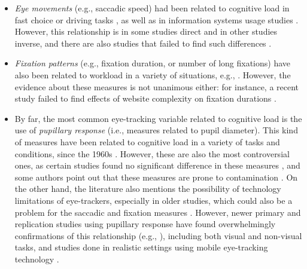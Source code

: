 \documentclass[10pt,journal,compsoc]{IEEEtran}
\begin{document}
\begin{itemize}
\item \textit{Eye movements} (e.g., saccadic speed) had been related to cognitive load in fast choice \cite{boucsein2000engineering} or driving tasks \cite{reyes2008effects}, as well as in information systems usage studies \cite{Buettner2013}. However, this relationship is in some studies direct and in other studies inverse, and there are also studies that failed to find such differences \cite{de2009eye}.
\item \textit{Fixation patterns} (e.g., fixation duration, or number of long fixations) have also been related to workload in a variety of situations, e.g., \cite{backs1992eye,goldberg2002eye,poole2006eye,Buettner2013}. However, the evidence about these measures is not unanimous either: for instance, a recent study failed to find effects of website complexity on fixation durations \cite{wang2014eye}.
\item By far, the most common eye-tracking variable related to cognitive load is the use of \textit{pupillary response} (i.e., measures related to pupil diameter). This kind of measures have been related to cognitive load in a variety of tasks and conditions, since the 1960s \cite{kahneman1967perceptual}. However, these are also the most controversial ones, as certain studies found no significant difference in these measures \cite{schultheis2004assessing}, and some authors point out that these measures are prone to contamination \cite{poole2006eye}. On the other hand, the literature also mentions the possibility of technology limitations of eye-trackers, especially in older studies, which could also be a problem for the saccadic and fixation measures \cite{jacob2003eye}. However, newer primary and replication studies using pupillary response have found overwhelmingly confirmations of this relationship (e.g., \cite{klingner2010measuring,palinko2010estimating,Buettner2013,stuijfzand2016medical}), including both visual and non-visual tasks, and studies done in realistic settings using mobile eye-tracking technology \cite{szulewski2016measuring}.
\end{itemize}
\end{document}
